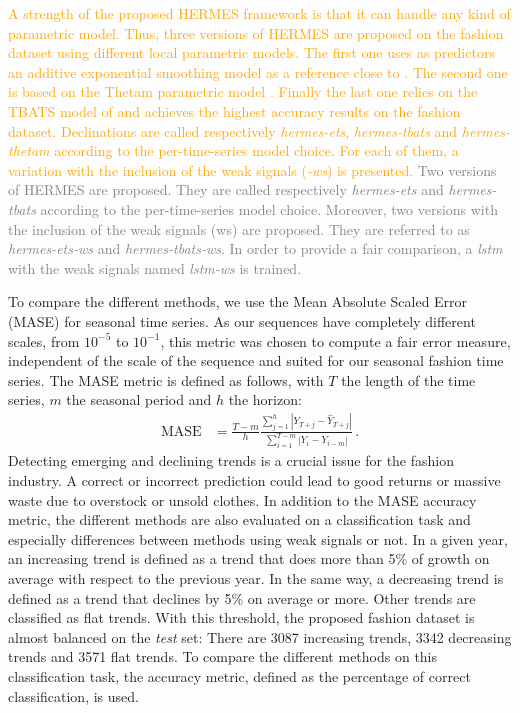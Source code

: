 \documentclass[10pt]{article} %
\begin{document}
\textcolor{orange}{A strength of the proposed HERMES framework is that it can handle any kind of parametric model. Thus, three versions of HERMES are proposed on the fashion dataset using different local parametric models. The first one uses as predictors an additive exponential smoothing model as a reference close to \citet{smyl2020}. The second one is based on the Thetam parametric model \citep{hyndman2020}. Finally the last one relies on the TBATS model of \citet{alysha2011} and  achieves the highest accuracy results on the fashion dataset. Declinations are called respectively \textit{hermes-ets}, \textit{hermes-tbats} and \textit{hermes-thetam} according to the per-time-series model choice. For each of them, a variation with the inclusion of the weak signals (\textit{-ws}) is presented.}
\textcolor{gray}{Two versions of HERMES are proposed. They are called respectively \textit{hermes-ets} and \textit{hermes-tbats} according to the per-time-series model choice. Moreover, two versions with the inclusion of the weak signals (ws) are proposed. They are referred to as \textit{hermes-ets-ws} and \textit{hermes-tbats-ws}. In order to provide a fair comparison, a \textit{lstm} with the weak signals named \textit{lstm-ws} is trained.}

To compare the different methods, we use the Mean Absolute Scaled Error (MASE) for seasonal time series. As our sequences have completely different scales, from $10^{-5}$ to $10^{-1}$, this metric was chosen to compute a fair error measure, independent of the scale of the sequence and suited for our seasonal fashion time series. The MASE metric is defined as follows, with $T$ the length of the time series, $m$ the seasonal period and $h$ the horizon:
\begin{align*}
\mathrm{MASE} &= \frac{T-m}{h}\frac{\sum_{j=1}^h |Y_{T+j} - \hat{Y}_{T+j}| }{\sum_{i=1}^{T-m} |Y_i - Y_{i-m}|}\,.
\end{align*}
Detecting emerging and declining trends is a crucial issue for the fashion industry. A correct or incorrect prediction could lead to good returns or massive waste due to overstock or unsold clothes. In addition to the MASE accuracy metric, the different methods are also evaluated on a classification task and especially differences between methods using weak signals or not. In a given year, an increasing trend is defined as a trend that does more than 5\% of growth on average with respect to the previous year. In the same way, a decreasing trend is defined as a trend that declines by 5\% on average or more. Other trends are classified as flat trends. With this threshold, the proposed fashion dataset is almost balanced on the {\em test} set: There are 3087 increasing trends, 3342 decreasing trends and 3571 flat trends. To compare the different methods on this classification task, the accuracy metric, defined as the percentage of correct classification, is used.
\end{document}
